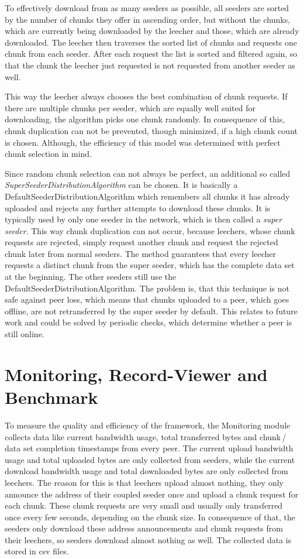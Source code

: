 To effectively download from as many seeders as possible, all seeders are sorted by the number of chunks they offer in ascending order, but without the chunks, which are currently being downloaded by the leecher and those, which are already downloaded. The leecher then traverses the sorted list of chunks and requests one chunk from each seeder. After each request the list is sorted and filtered again, so that the chunk the leecher just requested is not requested from another seeder as well. 

This way the leecher always chooses the best combination of chunk requests. If there are multiple chunks per seeder, which are equally well suited for downloading, the algorithm picks one chunk randomly. In consequence of this, chunk duplication can not be prevented, though minimized, if a high chunk count is chosen. Although, the efficiency of this model was determined with perfect chunk selection in mind. 

Since random chunk selection can not always be perfect, an additional so called \emph{SuperSeederDistributionAlgorithm} can be chosen. It is basically a DefaultSeederDistributionAlgorithm which remembers all chunks it has already uploaded and rejects any further attempts to download these chunks. It is typically used by only one seeder in the network, which is then called a \emph{super seeder}. This way chunk duplication can not occur, because leechers, whose chunk requests are rejected, simply request another chunk and request the rejected chunk later from normal seeders. The method guarantees that every leecher requests a distinct chunk from the super seeder, which has the complete data set at the beginning. The other seeders still use the DefaultSeederDistributionAlgorithm. The problem is, that this technique is not safe against peer loss, which means that chunks uploaded to a peer, which goes offline, are not retransferred by the super seeder by default. This relates to future work and could be solved by periodic checks, which determine whether a peer is still online.


\section{Monitoring, Record-Viewer and Benchmark}
\label{module:monitoring}

To measure the quality and efficiency of the framework, the Monitoring module collects data like current bandwidth usage, total transferred bytes and chunk\,/\,data set completion timestamps from every peer. The current upload bandwidth usage and total uploaded bytes are only collected from seeders, while the current download bandwidth usage and total downloaded bytes are only collected from leechers. The reason for this is that leechers upload almost nothing, they only announce the address of their coupled seeder once and upload a chunk request for each chunk. These chunk requests are very small and usually only transferred once every few seconds, depending on the chunk size. In consequence of that, the seeders only download these address announcements and chunk requests from their leechers, so seeders download almost nothing as well. The collected data is stored in csv files.

